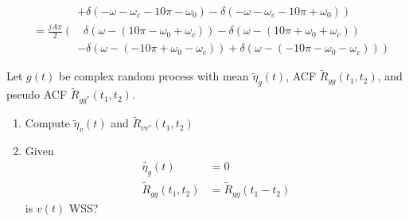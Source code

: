 \documentclass[titlepage, fleqn, a4paper, 12pt, twoside]{article}
\theoremstyle{definition}
\theoremstyle{theorem}
\renewcommand{\tilde}{\widetilde}
\begin{document}
\begin{solution}
\begin{enumerate}
\begin{align*}
				&\quad\quad\quad\quad \left. + \delta(-\omega - \omega_c - 10 \pi - \omega_0) - \delta(-\omega - \omega_c - 10 \pi + \omega_0) \right)\\
				&= \frac{j A \pi}{2} \left( \quad \delta\left( \omega - (10 \pi - \omega_0 + \omega_c) \right) - \delta\left( \omega - (10 \pi + \omega_0 + \omega_c) \right) \right.\\
				&\quad\quad\quad\quad \left. - \delta\left( \omega - (-10 \pi + \omega_0 - \omega_c) \right) + \delta\left( \omega - (-10 \pi - \omega_0 - \omega_c) \right) \right)
			\end{align*}
	\end{enumerate}
\end{solution}

\begin{question}
	Let $g(t)$ be complex random process with mean $\tilde{\eta}_g(t)$, ACF $\tilde{R}_{g g}(t_1,t_2)$, and pseudo ACF $\tilde{R}_{g g^*}(t_1,t_2)$.
	\begin{enumerate}
		\item
			Compute $\tilde{\eta}_v(t)$ and $\tilde{R}_{v v^*}(t_1,t_2)$
		\item
			Given
			\begin{align*}
				\tilde{\eta_g}(t) &= 0\\
				\tilde{R}_{g g}(t_1,t_2) &= \tilde{R}_{g g}(t_1 - t_2)
			\end{align*}
			is $v(t)$ WSS?
	\end{enumerate}
\end{question}
\end{document}
